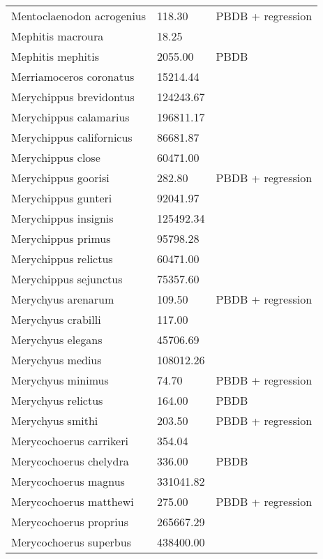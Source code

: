 \begin{longtable}{p{} p{} p{}}
    Mentoclaenodon acrogenius & 118.30 & PBDB + regression \\ 
    Mephitis macroura & 18.25 & \cite{Smith2004} \\ 
    Mephitis mephitis & 2055.00 & PBDB \\ 
    Merriamoceros coronatus & 15214.44 & \cite{Tomiya2013} \\ 
    Merychippus brevidontus & 124243.67 & \cite{Tomiya2013} \\ 
    Merychippus calamarius & 196811.17 & \cite{Tomiya2013} \\ 
    Merychippus californicus & 86681.87 & \cite{Tomiya2013} \\ 
    Merychippus close & 60471.00 & \cite{McKenna2011} \\ 
    Merychippus goorisi & 282.80 & PBDB + regression \\ 
    Merychippus gunteri & 92041.97 & \cite{Tomiya2013} \\ 
    Merychippus insignis & 125492.34 & \cite{Tomiya2013} \\ 
    Merychippus primus & 95798.28 & \cite{Tomiya2013} \\ 
    Merychippus relictus & 60471.00 & \cite{McKenna2011} \\ 
    Merychippus sejunctus & 75357.60 & \cite{Tomiya2013} \\ 
    Merychyus arenarum & 109.50 & PBDB + regression \\ 
    Merychyus crabilli & 117.00 & \cite{Johansen1996} \\ 
    Merychyus elegans & 45706.69 & \cite{Tomiya2013} \\ 
    Merychyus medius & 108012.26 & \cite{Tomiya2013} \\ 
    Merychyus minimus & 74.70 & PBDB + regression \\ 
    Merychyus relictus & 164.00 & PBDB \\ 
    Merychyus smithi & 203.50 & PBDB + regression \\ 
    Merycochoerus carrikeri & 354.04 & \cite{Rose2011a} \\ 
    Merycochoerus chelydra & 336.00 & PBDB \\ 
    Merycochoerus magnus & 331041.82 & \cite{Tomiya2013} \\ 
    Merycochoerus matthewi & 275.00 & PBDB + regression \\ 
    Merycochoerus proprius & 265667.29 & \cite{Tomiya2013} \\ 
    Merycochoerus superbus & 438400.00 & \cite{McKenna2011} \\ 

\end{longtable}
